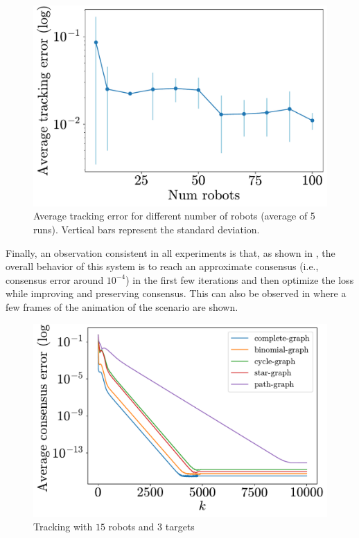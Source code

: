 \documentclass[a4paper,11pt,oneside]{book}
\begin{document}
\begin{figure}[H]
      \centering
      \includegraphics[width=0.46\linewidth]{./figs/tracking/average/avg_tracking.pdf}
      \caption{Average tracking error for different number of robots (average of 5 runs). Vertical bars represent the standard deviation.}
      \label{fig:tracking_avg_error_runs}
\end{figure}


Finally, an observation consistent in all experiments is that, as shown in , the overall behavior of this system is to reach an approximate consensus (i.e., consensus error around $10^{-4}$) in the first few iterations and then optimize the loss while improving and preserving consensus. This can also be observed in  where a few frames of the animation of the scenario are shown.

\begin{figure}[H]
      \centering
      \includegraphics[width=0.46\linewidth]{./figs/tracking/15_3_2/consensus.pdf} 
      \caption{Tracking with $15$ robots and $3$ targets}
      \label{fig:tracking_consensus}
\end{figure}
\end{document}
